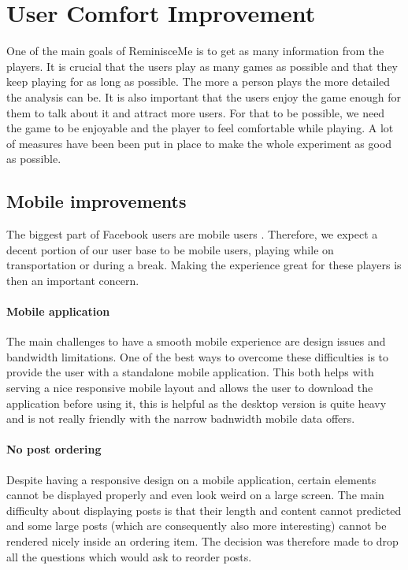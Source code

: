 \chapter{User Comfort Improvement}
One of the main goals of ReminisceMe is to get as many information from the players. It is crucial that the users play as many games as possible and that they keep playing for as long as possible. The more a person plays the more detailed the analysis can be. It is also important that the users enjoy the game enough for them to talk about it and attract more users. For that to be possible, we need the game to be enjoyable and the player to feel comfortable while playing. A lot of measures have been been put in place to make the whole experiment as good as possible.
\section{Mobile improvements}
The biggest part of Facebook users are mobile users \cite{mobileusage}. Therefore, we expect a decent portion of our user base to be mobile users, playing while on transportation or during a break. Making the experience great for these players is then an important concern.
\subsubsection{Mobile application}
The main challenges to have a smooth mobile experience are design issues and bandwidth limitations. One of the best ways to overcome these difficulties is to provide the user with a standalone mobile application. This both helps with serving a nice responsive mobile layout and allows the user to download the application before using it, this is helpful as the desktop version is quite heavy and is not really friendly with the narrow badnwidth mobile data offers.
\subsubsection{No post ordering}
Despite having a responsive design on a mobile application, certain elements cannot be displayed properly and even look weird on a large screen. The main difficulty about displaying posts is that their length and content cannot predicted and some large posts (which are consequently also more interesting) cannot be rendered nicely inside an ordering item. The decision was therefore made to drop all the questions which would ask to reorder posts.
